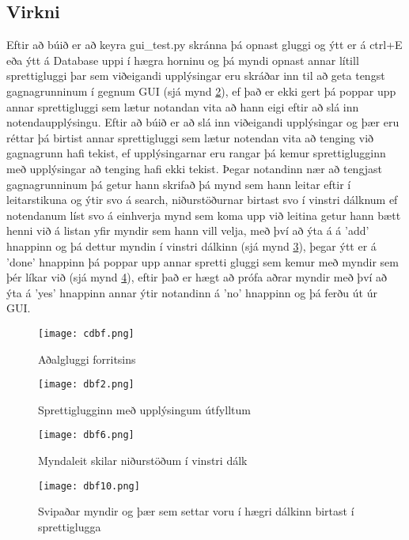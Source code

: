 \documentclass[12pt, git, draft]{rureport}
\begin{document}
\subsection {Virkni}
Eftir að búið er að keyra gui\_test.py skránna þá opnast gluggi og ýtt er á ctrl+E eða ýtt á Database uppi í hægra horninu og þá myndi opnast annar lítill sprettigluggi þar sem viðeigandi upplýsingar eru skráðar inn til að geta tengst gagnagrunninum í gegnum GUI (sjá mynd \ref{fig:dbf2}), ef það er ekki gert þá poppar upp annar sprettigluggi sem lætur notandan vita að hann eigi eftir að slá inn notendaupplýsingu.
\newline
\newline
Eftir að búið er að slá inn viðeigandi upplýsingar og þær eru réttar þá birtist annar sprettigluggi sem lætur notendan vita að tenging við gagnagrunn hafi tekist, ef upplýsingarnar eru rangar þá kemur sprettiglugginn með upplýsingar að tenging hafi ekki tekist.
\newline
\newline
Þegar notandinn nær að tengjast gagnagrunninum þá getur hann skrifað þá mynd sem hann leitar eftir í leitarstikuna og ýtir svo á search, niðurstöðurnar birtast svo í vinstri dálknum ef notendanum líst svo á einhverja mynd sem koma upp við leitina  getur hann bætt henni við á listan yfir myndir sem hann vill velja, með því að ýta á á 'add' hnappinn og þá dettur myndin í vinstri dálkinn (sjá mynd \ref{fig:dbf6}), þegar ýtt er á 'done' hnappinn þá poppar upp annar spretti gluggi sem kemur með myndir sem þér líkar við (sjá mynd \ref{fig:dbf10}), eftir það er hægt að prófa aðrar myndir með því að ýta á 'yes' hnappinn annar ýtir notandinn á 'no' hnappinn og þá ferðu út úr GUI.

\pagebreak

\begin{figure}
	\centering 
	\texttt{[image: cdbf.png]}
	\caption{Aðalgluggi forritsins \label{fig:cdbf}}
\end{figure}

\begin{figure}
	\centering 
	\texttt{[image: dbf2.png]}
	\caption{Sprettiglugginn með upplýsingum útfylltum \label{fig:dbf2}}
\end{figure}


\begin{figure}
	\centering 
	\texttt{[image: dbf6.png]}
	\caption{Myndaleit skilar niðurstöðum í vinstri dálk\label{fig:dbf6}}
\end{figure}

\begin{figure}
	\centering 
	\texttt{[image: dbf10.png]}
	\caption{Svipaðar myndir og þær sem settar voru í hægri dálkinn birtast í sprettiglugga\label{fig:dbf10}}
\end{figure}

\clearpage
\printbibliography
\end{document}
